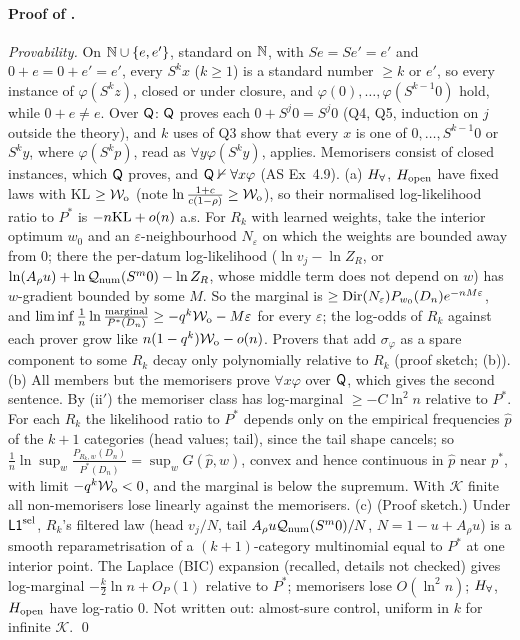 \paragraph{Proof of .} \emph{Provability.} On $\mathbb{N}\cup\{e,e'\}$, standard on $\mathbb{N}$, with $Se=Se'=e'$ and $0+e=0+e'=e'$, every $S^kx$ ($k\ge1$) is a standard number $\ge k$ or $e'$, so every instance of $\varphi(S^kz)$, closed or under closure, and $\varphi(0),\dots,\varphi(S^{k-1}0)$ hold, while $0+e\neq e$. Over $\mathsf{Q}$: $\mathsf{Q}$ proves each $0+S^j0=S^j0$ (Q4, Q5, induction on $j$ outside the theory), and $k$ uses of Q3 show that every $x$ is one of $0,\dots,S^{k-1}0$ or $S^ky$, where $\varphi(S^kp)$, read as $\forall y\varphi(S^ky)$, applies. Memorisers consist of closed instances, which $\mathsf{Q}$ proves, and $\mathsf{Q}\nvdash\forall x\varphi$ (AS Ex~4.9).
(a) $H_{\forall}$, $H_{\mathrm{open}}$ have fixed laws with KL $\ge\mathcal{W}_{\mathrm{o}}$ (note $\ln\frac{1+c}{c(1-\rho)}\ge\mathcal{W}_{\mathrm{o}}$), so their normalised log-likelihood ratio to $P^*$ is $-n\mathrm{KL}+o(n)$ a.s. For $R_k$ with learned weights, take the interior optimum $w_0$ and an $\varepsilon$-neighbourhood $N_\varepsilon$ on which the weights are bounded away from $0$; there the per-datum log-likelihood ($\ln v_j-\ln Z_R$, or $\ln(A_\rho u)+\ln\mathcal{Q}_{\mathrm{num}}(S^m0)-\ln Z_R$, whose middle term does not depend on $w$) has $w$-gradient bounded by some $M$. So the marginal is $\ge\mathrm{Dir}(N_\varepsilon)P_{w_0}(D_n)e^{-nM\varepsilon}$, and $\liminf\frac1n\ln\frac{\text{marginal}}{P^*(D_n)}\ge-q^k\mathcal{W}_{\mathrm{o}}-M\varepsilon$ for every $\varepsilon$; the log-odds of $R_k$ against each prover grow like $n(1-q^k)\mathcal{W}_{\mathrm{o}}-o(n)$. Provers that add $\sigma_\varphi$ as a spare component to some $R_k$ decay only polynomially relative to $R_k$ (proof sketch; (b)).
(b) All members but the memorisers prove $\forall x\varphi$ over $\mathsf{Q}$, which gives the second sentence. By (ii$'$) the memoriser class has log-marginal $\ge-C\ln^2n$ relative to $P^*$. For each $R_k$ the likelihood ratio to $P^*$ depends only on the empirical frequencies $\hat p$ of the $k+1$ categories (head values; tail), since the tail shape cancels; so $\frac1n\ln\sup_w\frac{P_{R_k,w}(D_n)}{P^*(D_n)}=\sup_wG(\hat p,w)$, convex and hence continuous in $\hat p$ near $p^*$, with limit $-q^k\mathcal{W}_{\mathrm{o}}<0$, and the marginal is below the supremum. With $\mathcal K$ finite all non-memorisers lose linearly against the memorisers.
(c) (Proof sketch.) Under $\mathord{\mathsf{L1}}^{\mathrm{sel}}$, $R_k$'s filtered law (head $v_j/N$, tail $A_\rho u\mathcal{Q}_{\mathrm{num}}(S^m0)/N$, $N=1-u+A_\rho u$) is a smooth reparametrisation of a $(k+1)$-category multinomial equal to $P^*$ at one interior point. The Laplace (BIC) expansion \citep{schwarz1978estimating,clarke1990information} (recalled, details not checked) gives log-marginal $-\frac k2\ln n+O_P(1)$ relative to $P^*$; memorisers lose $O(\ln^2n)$; $H_{\forall}$, $H_{\mathrm{open}}$ have log-ratio $0$. Not written out: almost-sure control, uniform in $k$ for infinite $\mathcal K$. \qed

